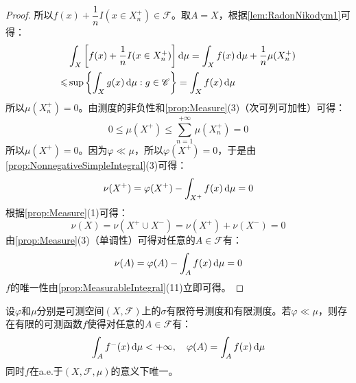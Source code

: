 \begin{proof}
	所以$f(x)+\dfrac{1}{n}I(x\in X_n^+)\in\mathscr{F}$。取$A=X$，根据\cref{lem:RadonNikodym1}可得：
	\begin{align*}
		&\int_{X}\left[f(x)+\frac{1}{n}I(x\in X_n^+)\right]\mathop{}\!\mathrm{d}\mu=\int_{X}f(x)\mathop{}\!\mathrm{d}\mu+\frac{1}{n}\mu(X_n^+) \\
		\leqslant&\sup\left\{\int_{X}g(x)\mathop{}\!\mathrm{d}\mu:g\in\mathscr{C}\right\}=\int_{X}f(x)\mathop{}\!\mathrm{d}\mu
	\end{align*}
	所以$\mu(X_n^+)=0$。由测度的非负性和\cref{prop:Measure}(3)（次可列可加性）可得：
	\begin{equation*}
		0\leqslant\mu(X^+)\leqslant\sum_{n=1}^{+\infty}\mu(X_n^+)=0
	\end{equation*}
	所以$\mu(X^+)=0$。因为$\varphi\ll\mu$，所以$\varphi(X^+)=0$，于是由\cref{prop:NonnegativeSimpleIntegral}(3)可得：
	\begin{equation*}
		\nu(X^+)=\varphi(X^+)-\int_{X^+}f(x)\mathop{}\!\mathrm{d}\mu=0
	\end{equation*}
	根据\cref{prop:Measure}(1)可得：
	\begin{equation*}
		\nu(X)=\nu(X^+\cup X^-)=\nu(X^+)+\nu(X^-)=0
	\end{equation*}
	由\cref{prop:Measure}(3)（单调性）可得对任意的$A\in\mathscr{F}$有：
	\begin{equation*}
		\nu(A)=\varphi(A)-\int_{A}f(x)\mathop{}\!\mathrm{d}\mu=0
	\end{equation*}
	$f$的唯一性由\cref{prop:MeasurableIntegral}(11)立即可得。
\end{proof}
\begin{lemma}\label{lem:RadonNikodym3}
	设$\varphi$和$\mu$分别是可测空间$(X,\mathscr{F})$上的$\sigma$有限符号测度和有限测度。若$\varphi\ll\mu$，则存在有限的可测函数$f$使得对任意的$A\in\mathscr{F}$有：
	\begin{equation*}
		\int_{A}f^-(x)\mathop{}\!\mathrm{d}\mu<+\infty,\quad\varphi(A)=\int_{A}f(x)\mathop{}\!\mathrm{d}\mu
	\end{equation*}
	同时$f$在a.e.于$(X,\mathscr{F},\mu)$的意义下唯一。
\end{lemma}
